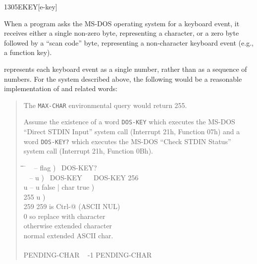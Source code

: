\begin{worddef}{1305}{EKEY}[e-key]
\begin{defer}
		When a program asks the MS-DOS operating system for a keyboard
		event, it receives either a single non-zero byte, representing
		a character, or a zero byte followed by a ``scan code'' byte,
		representing a non-character keyboard event (e.g., a function
		key).

		 represents each keyboard event as a single number,
		rather than as a sequence of numbers. For the system described
		above, the following would be a reasonable implementation of
		 and related words:

		\begin{quote}
			The \texttt{MAX-CHAR} environmental query would return 255.

			Assume the existence of a word
			\texttt{DOS-KEY} 
			which executes the MS-DOS ``Direct STDIN Input'' system call
			(Interrupt 21h, Function 07h) and a word
			\texttt{DOS-KEY?} 
			which executes the MS-DOS ``Check STDIN Status'' system call
			(Interrupt 21h, Function 0Bh).

			\ttfamily
			\begin{tabbing}
			\tab \= \tab \= \tab \= \tab \= \hspace{7em} \= \kill
			\word{:} ~  -- flag )~
				DOS-KEY?~  \word{;} \\[\parskip]

			\word{:} ~  -- u )~
				DOS-KEY~   ~
					DOS-KEY 256 \word{+}~  \word{;} \\[\parskip]

			\+ \word{:}   u -- u false | char true ) \\
				\+  255   		\>\>\>\>	\word{p} u ) \\
					 259 \word{=}  		\>\>\>		 259 is Ctrl-@ (ASCII NUL) \\
					\>  0  \>\>		 so replace with character \\
				\-   		\>\>\>		 otherwise extended character \\
			\-  						\>\>\>\>	 normal extended ASCII char. \\
			\word{;} \\[\parskip]

			 PENDING-CHAR ~ -1 PENDING-CHAR \word{!} \\[\parskip]


\end{tabbing}
\end{quote}
\end{defer}
\end{worddef}
